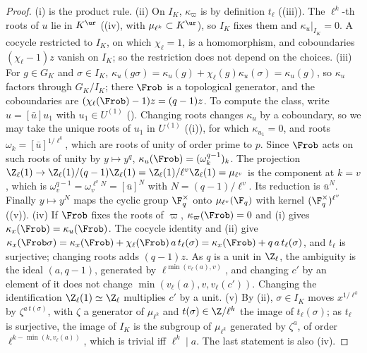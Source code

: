 \begin{proof}
(i) is the product rule. (ii) On $I_K$, $\kappa_\varpi$ is by definition $t_\ell$ ((iii)). The $\ell^k$-th roots of $u$ lie in
$K^{\ur}$ ((iv), with $\mu_{\ell^k}\subset K^{\ur}$), so $I_K$ fixes them and $\kappa_u|_{I_K}=0$. A cocycle restricted to $I_K$, on which
$\chi_\ell=1$, is a homomorphism, and coboundaries $(\chi_\ell-1)z$ vanish on $I_K$; so the restriction does not depend on the choices.
(iii) For $g\in G_K$ and $\sigma\in I_K$, $\kappa_u(g\sigma)=\kappa_u(g)+\chi_\ell(g)\kappa_u(\sigma)=\kappa_u(g)$, so $\kappa_u$ factors through $G_K/I_K$; there $\Frob$ is a topological
generator, and the coboundaries are $(\chi_\ell(\Frob)-1)z=(q-1)z$. To compute the class, write $u=[\bar u]u_1$ with $u_1\in U^{(1)}$ ().
Changing roots changes $\kappa_u$ by a coboundary, so we may take the unique roots of $u_1$ in $U^{(1)}$ ((i)), for which
$\kappa_{u_1}=0$, and roots $\omega_k=[\bar u]^{1/\ell^k}$, which are roots of unity of order prime to $p$. Since $\Frob$ acts on such roots of unity by
$y\mapsto y^q$, $\kappa_u(\Frob)=(\omega_k^{q-1})_k$. The projection $\Z_\ell(1)\to\Z_\ell(1)/(q-1)\Z_\ell(1)=\Z_\ell(1)/\ell^v\Z_\ell(1)=\mu_{\ell^v}$ is the component at
$k=v$, which is $\omega_v^{q-1}=\omega_v^{\ell^vN}=[\bar u]^N$ with $N=(q-1)/\ell^v$. Its reduction is $\bar u^N$. Finally $y\mapsto y^N$ maps the cyclic group
$\F_q^\times$ onto $\mu_{\ell^v}(\F_q)$ with kernel $(\F_q^\times)^{\ell^v}$ ((v)).
(iv) If $\Frob$ fixes the roots of $\varpi$, $\kappa_\varpi(\Frob)=0$ and (i) gives $\kappa_x(\Frob)=\kappa_u(\Frob)$. The cocycle identity and (ii) give
$\kappa_x(\Frob\sigma)=\kappa_x(\Frob)+\chi_\ell(\Frob)\,a\,t_\ell(\sigma)=\kappa_x(\Frob)+q\,a\,t_\ell(\sigma)$, and $t_\ell$ is surjective; changing roots adds $(q-1)z$. As $q$ is a unit in
$\Z_\ell$, the ambiguity is the ideal $(a,q-1)$, generated by $\ell^{\min(v_\ell(a),v)}$, and changing $c'$ by an element of it does not change
$\min(v_\ell(a),v,v_\ell(c'))$. Changing the identification $\Z_\ell(1)\simeq\Z_\ell$ multiplies $c'$ by a unit.
(v) By (ii), $\sigma\in I_K$ moves $x^{1/\ell^k}$ by $\zeta^{a\,t(\sigma)}$, with $\zeta$ a generator of $\mu_{\ell^k}$ and $t(\sigma)\in\Z/\ell^k$ the image of $t_\ell(\sigma)$; as
$t_\ell$ is surjective, the image of $I_K$ is the subgroup of $\mu_{\ell^k}$ generated by $\zeta^a$, of order $\ell^{k-\min(k,v_\ell(a))}$, which is trivial iff
$\ell^k\mid a$. The last statement is also (iv).
\end{proof}

